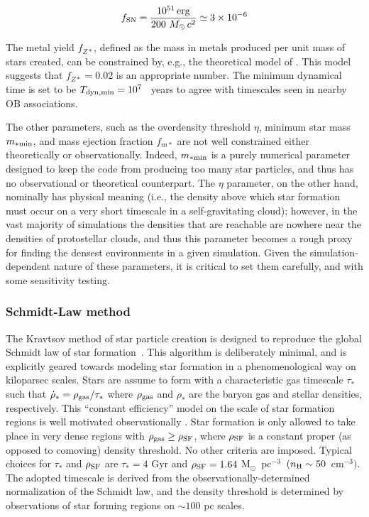\begin{equation}
f_{\rm SN} = \frac{10^{51}\, \mathrm{erg}}{200~M_\odot\, c^2} \simeq 3 \times 10^{-6}
\end{equation}

The metal yield $f_{Z*}$, defined as the mass in metals produced per
unit mass of stars created, can be constrained by, e.g., the
theoretical model of \citet{1995ApJS..101..181W}.  This model suggests
that $f_{Z*} = 0.02$ is an appropriate number.  The minimum dynamical
time is set to be $T_{\rm dyn,min} = 10^7$ ~years to agree with timescales
seen in nearby OB associations.

The other parameters, such as the overdensity threshold $\eta$,
minimum star mass $m_{\rm *min}$, and mass ejection fraction $f_{m*}$ are
not well constrained either theoretically or observationally.  Indeed,
$m_{\rm *min}$ is a purely numerical parameter designed to keep the code
from producing too many star particles, and thus has no observational
or theoretical counterpart.  The $\eta$ parameter, on the other hand,
nominally has physical meaning (i.e., the density above which star
formation must occur on a very short timescale in a self-gravitating
cloud); however, in the vast majority of simulations the densities
that are reachable are nowhere near the densities of protostellar
clouds, and thus this parameter becomes a rough proxy for finding the
densest environments in a given simulation.  Given the
simulation-dependent nature of these parameters, it is critical to set
them carefully, and with some sensitivity testing.

\subsubsection{Schmidt-Law method}
\label{sec:starform_kravtsov}

The Kravtsov method of star particle creation is designed to reproduce
the global Schmidt law of star formation~\citep{2003ApJ...590L...1K,
  1959ApJ...129..243S}.  This algorithm is deliberately minimal, and
is explicitly geared towards modeling star formation in a
phenomenological way on kiloparsec scales.  Stars are assume to form
with a characteristic gas timescale $\tau_*$ such that $\dot{\rho}_* =
\rho_{\rm gas}/\tau_*$ where $\rho_{\rm gas}$ and $\rho_*$ are the
baryon gas and stellar densities, respectively.  This ``constant
efficiency'' model on the scale of star formation regions is well
motivated observationally
\citep{1996AJ....112.1903Y,2002ApJ...569..157W}.  Star formation is
only allowed to take place in very dense regions with $\rho_{\rm gas}
\geq \rho_{\rm SF}$, where $\rho_{\rm SF}$ is a constant proper (as
opposed to comoving) density threshold.  No other criteria are
imposed.  Typical choices for $\tau_*$ and $\rho_{\rm SF}$ are $\tau_*
= 4$ Gyr and $\rho_{\rm SF} = 1.64~$M$_\odot$~pc$^{-3}$~$(n_{\rm H}
\sim 50$~cm$^{-3})$.  The adopted timescale is derived from the
observationally-determined normalization of the Schmidt law, and the
density threshold is determined by observations of star forming
regions on $\sim 100$ pc scales.

